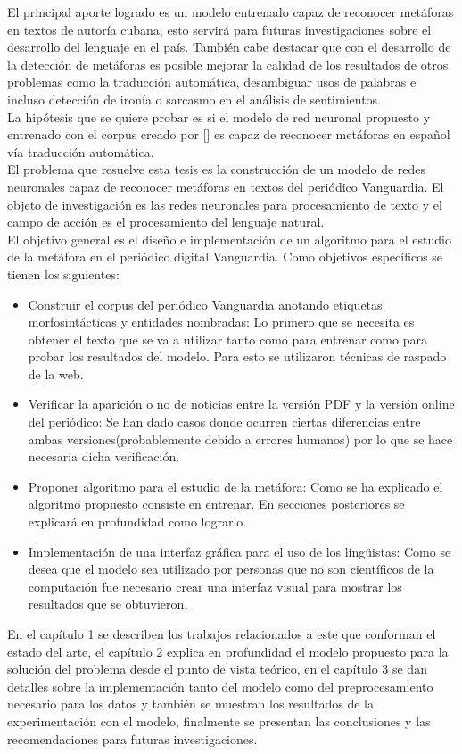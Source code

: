 El principal aporte logrado es un modelo entrenado capaz de reconocer metáforas en textos de autoría cubana, esto servirá para futuras investigaciones sobre el desarrollo del lenguaje en el país. También cabe destacar que con el desarrollo de la detección de metáforas es posible mejorar la calidad de los resultados de otros problemas como la traducción automática, desambiguar usos de palabras e incluso detección de ironía o sarcasmo en el análisis de sentimientos.\\

La hipótesis que se quiere probar es si el modelo de red neuronal propuesto y entrenado con el corpus creado por [\cite{Tsvetkov}] es capaz de reconocer metáforas en español vía traducción automática.\\
El problema que resuelve esta tesis es la construcción de un modelo de redes neuronales capaz de reconocer metáforas en textos del periódico Vanguardia. El objeto de investigación es las redes neuronales para procesamiento de texto y el campo de acción es el procesamiento del lenguaje natural.\\
 El objetivo general es el diseño e implementación de un algoritmo para el estudio de la metáfora en el periódico digital Vanguardia. Como objetivos específicos se tienen los siguientes:
\begin{itemize}
\item Construir el corpus del periódico Vanguardia anotando etiquetas morfosintácticas y entidades nombradas: Lo primero que se necesita es obtener el texto que se va a utilizar tanto como para entrenar como para probar los resultados del modelo. Para esto se utilizaron técnicas de raspado de la web.
\item Verificar la aparición o no de noticias entre la versión PDF y la versión online del periódico: Se han dado casos donde ocurren ciertas diferencias entre ambas versiones(probablemente debido a errores humanos) por lo que se hace necesaria dicha verificación.
\item Proponer algoritmo para el estudio de la metáfora: Como se ha explicado el algoritmo propuesto consiste en entrenar. En secciones posteriores se explicará en profundidad como lograrlo.
\item Implementación de una interfaz gráfica para el uso de los lingüistas: Como se desea que el modelo sea utilizado por personas que no son científicos de la computación fue necesario crear una interfaz visual para mostrar los resultados que se obtuvieron.
\end{itemize}

En el capítulo 1 se describen los trabajos relacionados a este que conforman el estado del arte, el capítulo 2 explica en profundidad el modelo propuesto para la solución del problema desde el punto de vista teórico, en el capítulo 3 se dan detalles sobre la implementación tanto del modelo como del preprocesamiento necesario para los datos y también se muestran los resultados de la experimentación con el modelo, finalmente se presentan las conclusiones y las recomendaciones para futuras investigaciones. 